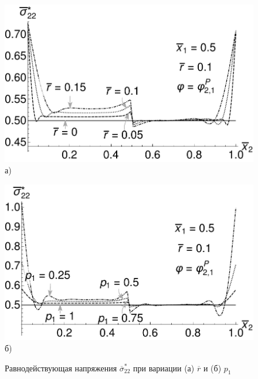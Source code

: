 \begin{figure}[ht]
    \begin{minipage}[b][][b]{0.49\linewidth}\centering
        \includegraphics[width=\linewidth]{pics/ResultantStressVariationR.pdf} \\ а)
    \end{minipage}
    \hfill
    \begin{minipage}[b][][b]{0.49\linewidth}\centering
        \includegraphics[width=\linewidth]{pics/ResultantStressVariationP1.pdf} \\ б)
    \end{minipage}
    \caption{Равнодействующая напряжения $\overline{\sigma}_{22}^*$ при вариации (а) $\overline{r}$ и (б) $p_1$}
    \label{fig:ResultantStress22}
\end{figure}

